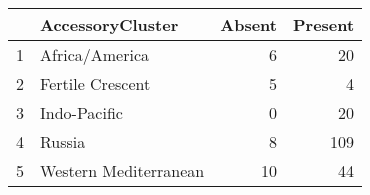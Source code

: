\begin{table}[ht]
\centering
\begin{tabular}{llrr}
  \hline
 & AccessoryCluster & Absent & Present \\ 
  \hline
1 & Africa/America & 6 & 20 \\ 
  2 & Fertile Crescent & 5 & 4 \\ 
  3 & Indo-Pacific & 0 & 20 \\ 
  4 & Russia & 8 & 109 \\ 
  5 & Western Mediterranean & 10 & 44 \\ 
   \hline
\end{tabular}
\end{table}
